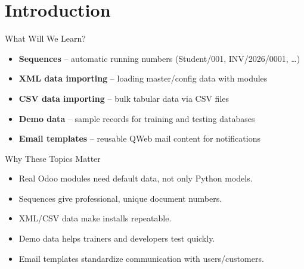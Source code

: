 \section{Introduction}

\begin{frame}{What Will We Learn?}
	\begin{itemize}
		\item \textbf{Sequences} -- automatic running numbers (Student/001, INV/2026/0001, \ldots)
		\item \textbf{XML data importing} -- loading master/config data with modules
		\item \textbf{CSV data importing} -- bulk tabular data via CSV files
		\item \textbf{Demo data} -- sample records for training and testing databases
		\item \textbf{Email templates} -- reusable QWeb mail content for notifications
	\end{itemize}
\end{frame}

\begin{frame}{Why These Topics Matter}
	\begin{itemize}
		\item Real Odoo modules need default data, not only Python models.
		\item Sequences give professional, unique document numbers.
		\item XML/CSV data make installs repeatable.
		\item Demo data helps trainers and developers test quickly.
		\item Email templates standardize communication with users/customers.
	\end{itemize}
\end{frame}
